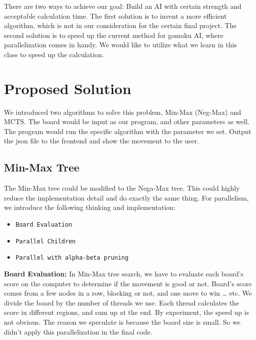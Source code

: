 \documentclass[sigconf]{acmart}
\begin{document}
There are two ways to achieve our goal: Build an AI with certain strength and acceptable calculation time. The first solution is to invent a more efficient algorithm, which is not in our consideration for the certain final project. The second solution is to speed up the current method for gomoku AI, where parallelization comes in handy. We would like to utilize what we learn in this class to speed up the calculation.







\section{Proposed Solution}

We introduced two algorithms to solve this problem, Min-Max (Neg-Max) and MCTS. The board would be input as our program, and other parameters as well. The program would run the specific algorithm with the parameter we set. Output the json file to the frontend and show the movement to the user.


\subsection{Min-Max Tree}

The Min-Max tree could be modified to the Nega-Max tree. This could highly reduce the implementation detail and do exactly the same thing. For parallelism, we introduce the following thinking and implementation:
 
\begin{itemize}
\item {\verb|Board Evaluation|}
\item {\verb|Parallel Children|}
\item {\verb|Parallel with alpha-beta pruning |}
\end{itemize}

{\bfseries Board Evaluation:}
In Min-Max tree search, we have to evaluate each board’s score on the computer to determine if the movement is good or not. Board’s score comes from a few nodes in a row, blocking or not, and one move to win … etc. We divide the board by the number of threads we use. Each thread calculates the score in different regions, and sum up at the end. By experiment, the speed up is not obvious. The reason we speculate is because the board size is small. So we didn’t apply this parallelization in the final code.
\end{document}

